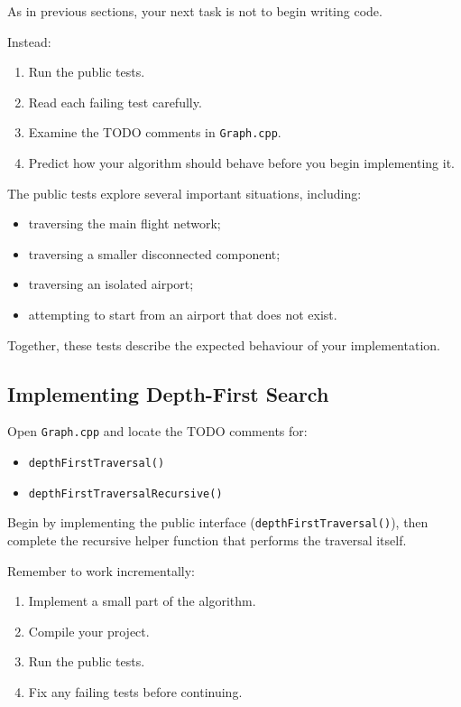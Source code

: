 \documentclass{csc2059practical}
\begin{document}
As in previous sections, your next task is not to begin writing code.

Instead:

\begin{enumerate}
    \item Run the public tests.
    \item Read each failing test carefully.
    \item Examine the TODO comments in \texttt{Graph.cpp}.
    \item Predict how your algorithm should behave before you begin implementing it.
\end{enumerate}

The public tests explore several important situations, including:

\begin{itemize}
    \item traversing the main flight network;
    \item traversing a smaller disconnected component;
    \item traversing an isolated airport;
    \item attempting to start from an airport that does not exist.
\end{itemize}

Together, these tests describe the expected behaviour of your implementation.

\subsection{Implementing Depth-First Search}

Open \texttt{Graph.cpp} and locate the TODO comments for:

\begin{itemize}
    \item \texttt{depthFirstTraversal()}
    \item \texttt{depthFirstTraversalRecursive()}
\end{itemize}

Begin by implementing the public interface (\texttt{depthFirstTraversal()}), then complete the recursive helper function that performs the traversal itself.

Remember to work incrementally:

\begin{enumerate}
    \item Implement a small part of the algorithm.
    \item Compile your project.
    \item Run the public tests.
    \item Fix any failing tests before continuing.
\end{enumerate}
\end{document}
